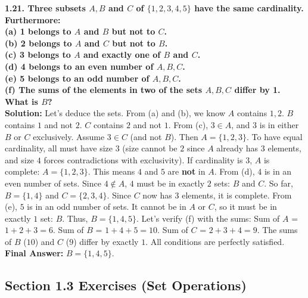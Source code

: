 \documentclass[12pt]{article}
\begin{document}
\vspace{0.5cm}
\textbf{1.21. Three subsets $A, B$ and $C$ of $\{1, 2, 3, 4, 5\}$ have the same cardinality. Furthermore: \\
(a) 1 belongs to $A$ and $B$ but not to $C$.\\
(b) 2 belongs to $A$ and $C$ but not to $B$.\\
(c) 3 belongs to $A$ and exactly one of $B$ and $C$.\\
(d) 4 belongs to an even number of $A, B, C$.\\
(e) 5 belongs to an odd number of $A, B, C$.\\
(f) The sums of the elements in two of the sets $A, B, C$ differ by 1. \\
What is $B$?} \\
\textbf{Solution:}
Let's deduce the sets.
From (a) and (b), we know $A$ contains $1, 2$. $B$ contains $1$ and not $2$. $C$ contains $2$ and not $1$.
From (c), $3 \in A$, and $3$ is in either $B$ or $C$ exclusively.
Assume $3 \in C$ (and not $B$). Then $A = \{1, 2, 3\}$. To have equal cardinality, all must have size $3$ (size cannot be $2$ since $A$ already has $3$ elements, and size $4$ forces contradictions with exclusivity).
If cardinality is $3$, $A$ is complete: $A = \{1, 2, 3\}$.
This means $4$ and $5$ are \textbf{not} in $A$.
From (d), $4$ is in an even number of sets. Since $4 \notin A$, $4$ must be in exactly $2$ sets: $B$ and $C$.
So far, $B = \{1, 4\}$ and $C = \{2, 3, 4\}$.
Since $C$ now has $3$ elements, it is complete.
From (e), $5$ is in an odd number of sets. It cannot be in $A$ or $C$, so it must be in exactly $1$ set: $B$.
Thus, $B = \{1, 4, 5\}$.
Let's verify (f) with the sums:
Sum of $A$ = $1+2+3 = 6$.
Sum of $B$ = $1+4+5 = 10$.
Sum of $C$ = $2+3+4 = 9$.
The sums of $B$ ($10$) and $C$ ($9$) differ by exactly $1$.
All conditions are perfectly satisfied.
\textbf{Final Answer:} $B = \{1, 4, 5\}$.

\subsection{Section 1.3 Exercises (Set Operations)}
\end{document}

